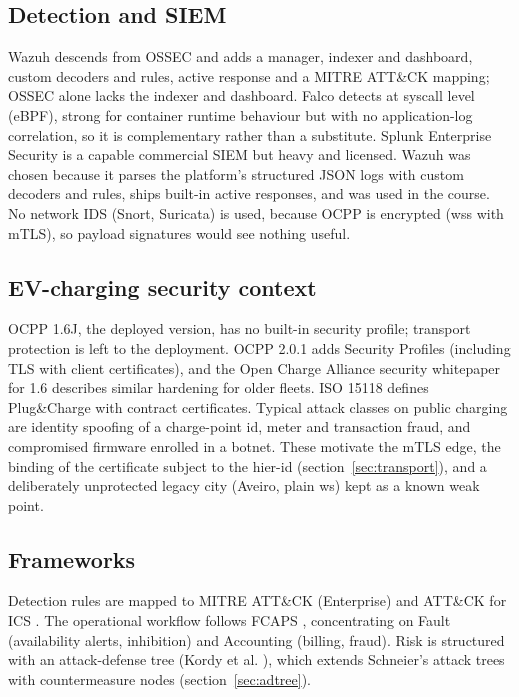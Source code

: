 \documentclass[a4paper,11pt]{article}
\numberwithin{table}{section}
\begin{document}
\subsection{Detection and SIEM}
Wazuh \cite{wazuh} descends from OSSEC \cite{ossec} and adds a manager, indexer and dashboard, custom decoders and rules, active response and a MITRE ATT\&CK mapping; OSSEC alone lacks the indexer and dashboard. Falco \cite{falco} detects at syscall level (eBPF), strong for container runtime behaviour but with no application-log correlation, so it is complementary rather than a substitute. Splunk Enterprise Security \cite{splunk} is a capable commercial SIEM but heavy and licensed. Wazuh was chosen because it parses the platform's structured JSON logs with custom decoders and rules, ships built-in active responses, and was used in the course. No network IDS (Snort, Suricata) is used, because OCPP is encrypted (wss with mTLS), so payload signatures would see nothing useful.

\subsection{EV-charging security context}
OCPP 1.6J, the deployed version, has no built-in security profile; transport protection is left to the deployment. OCPP 2.0.1 \cite{ocpp201} adds Security Profiles (including TLS with client certificates), and the Open Charge Alliance security whitepaper for 1.6 \cite{ocpp16sec} describes similar hardening for older fleets. ISO 15118 \cite{iso15118} defines Plug\&Charge with contract certificates. Typical attack classes on public charging are identity spoofing of a charge-point id, meter and transaction fraud, and compromised firmware enrolled in a botnet. These motivate the mTLS edge, the binding of the certificate subject to the hier-id (section~\ref{sec:transport}), and a deliberately unprotected legacy city (Aveiro, plain ws) kept as a known weak point.

\subsection{Frameworks}
Detection rules are mapped to MITRE ATT\&CK (Enterprise) and ATT\&CK for ICS \cite{mitre}. The operational workflow follows FCAPS \cite{itum3400}, concentrating on Fault (availability alerts, inhibition) and Accounting (billing, fraud). Risk is structured with an attack-defense tree (Kordy et al. \cite{kordy}), which extends Schneier's attack trees \cite{schneier} with countermeasure nodes (section~\ref{sec:adtree}).
\end{document}
